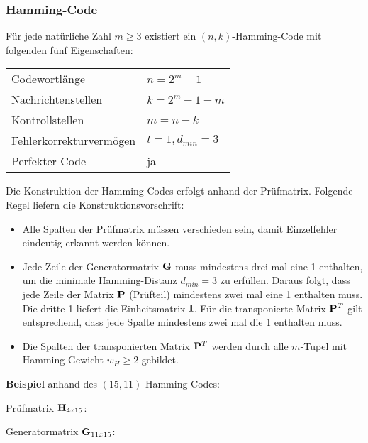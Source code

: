 \subsubsection{Hamming-Code}

Für jede natürliche Zahl $m \ge 3$ existiert ein $(n,k)$-Hamming-Code mit folgenden
fünf Eigenschaften:

\begin{center}
\begin{tabular}[H]{ll}
	\hline
	Codewortlänge & $n = 2^m - 1$ \\
	Nachrichtenstellen & $k = 2^m - 1 - m$ \\
	Kontrollstellen & $m = n - k$ \\
	Fehlerkorrekturvermögen & $t = 1, d_{min} = 3$ \\
	Perfekter Code & ja \\
	\hline
\end{tabular}
\end{center}

Die Konstruktion der Hamming-Codes erfolgt anhand der Prüfmatrix. Folgende Regel
liefern die Konstruktionsvorschrift:
\begin{itemize}
	\item Alle Spalten der Prüfmatrix müssen verschieden sein, damit Einzelfehler
		eindeutig erkannt werden können.
	\item Jede Zeile der Generatormatrix $\mathbf{G}$ muss mindestens drei mal eine 1
		enthalten, um die minimale Hamming-Distanz $d_{min} = 3$ zu erfüllen. Daraus
		folgt, dass jede Zeile der Matrix $\mathbf{P}$ (Prüfteil) mindestens zwei mal
		eine 1 enthalten muss. Die dritte 1 liefert die Einheitsmatrix $\mathbf{I}$.
		Für die transponierte Matrix $\mathbf{P}^T$ gilt entsprechend, dass jede Spalte
		mindestens zwei mal die 1 enthalten muss.
	\item Die Spalten der transponierten Matrix $\mathbf{P}^T$ werden durch alle
		$m$-Tupel mit Hamming-Gewicht $w_H \ge 2$ gebildet.
\end{itemize}

\textbf{Beispiel} anhand des $(15,11)$-Hamming-Codes:

Prüfmatrix $\mathbf{H}_{4x15}$:



Generatormatrix $\mathbf{G}_{11x15}$:


